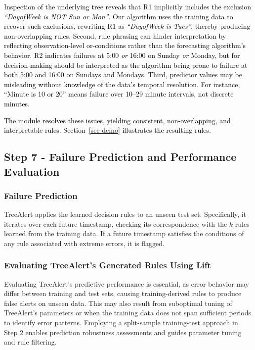 \documentclass[]{interact}
\theoremstyle{plain}
\theoremstyle{definition}
\theoremstyle{remark}
\newcommand{\galit}[1]{\textcolor{black}{#1}}
\newcommand{\matt}[1]{\textcolor{black}{#1}}
\begin{document}
\matt{Inspection of the underlying tree reveals that R1 implicitly includes the exclusion
\textit{``DayofWeek is NOT Sun or Mon''}. Our algorithm uses the training data to recover
such exclusions, rewriting R1 as \textit{``DayofWeek is Tues''}, thereby producing
non-overlapping rules. Second, rule phrasing can hinder interpretation by reflecting
observation-level or-conditions rather than the forecasting algorithm's behavior. R2
indicates failures at 5:00 \emph{or} 16:00 on Sunday \emph{or} Monday, but for
decision-making should be interpreted as the algorithm being prone to failure at both 5:00
and 16:00 on Sundays and Mondays. Third, predictor values may be misleading without
knowledge of the data's temporal resolution. For instance, ``Minute is 10 or 20''
\galit{means} failure over 10--29 minute intervals, not discrete minutes.}

\matt{The module resolves these issues, yielding consistent, non-overlapping, and
interpretable rules. Section~\ref{sec-demo} illustrates the resulting rules.}

\subsection{Step 7 - Failure Prediction and Performance Evaluation}

\subsubsection{Failure Prediction}

TreeAlert applies the learned decision rules to an unseen test set. Specifically, it
iterates over each future timestamp, checking its correspondence with the $k$ rules learned
from the training data. If a future timestamp satisfies the conditions of any rule associated
with extreme errors, it is flagged.

\subsubsection{Evaluating TreeAlert's Generated Rules Using Lift}
\label{Sup-A}

Evaluating TreeAlert's predictive performance is essential, as error behavior may differ
between training and test sets, causing training-derived rules to produce false alerts on
unseen data. This may also result from suboptimal tuning of TreeAlert's parameters or when
the training data does not span sufficient periods to identify error patterns. Employing a
split-sample training-test approach in Step 2 enables prediction robustness assessments and
guides parameter tuning and rule filtering.
\end{document}
